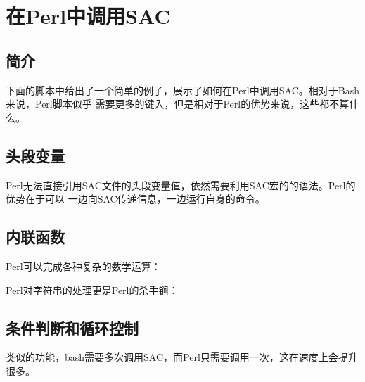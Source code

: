 \section{在Perl中调用SAC}
\label{sec:sac-perl}

\subsection{简介}
下面的脚本中给出了一个简单的例子，展示了如何在Perl中调用SAC。相对于Bash来说，Perl脚本似乎
需要更多的键入，但是相对于Perl的优势来说，这些都不算什么。


\subsection{头段变量}
Perl无法直接引用SAC文件的头段变量值，依然需要利用SAC宏的的语法。Perl的优势在于可以
一边向SAC传递信息，一边运行自身的命令。


\subsection{内联函数}
Perl可以完成各种复杂的数学运算：


Perl对字符串的处理更是Perl的杀手锏：


\subsection{条件判断和循环控制}
类似的功能，bash需要多次调用SAC，而Perl只需要调用一次，这在速度上会提升很多。

